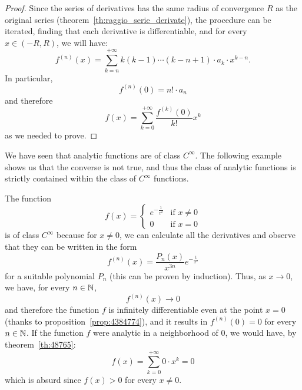 \begin{proof}
Since the series of derivatives has the same radius of convergence $R$ as the
original series (theorem~\ref{th:raggio_serie_derivate}), the procedure can be
iterated, finding that each derivative is differentiable, and for every $x\in
(-R,R)$, we will have:
\[
    f^{(n)}(x) = \sum_{k=n}^{+\infty}k (k-1) \cdots (k-n+1) \cdot a_k \cdot
  x^{k-n}.
\]
In particular,
\[
  f^{(n)}(0) = n! \cdot a_n
\]
and therefore
\[
  f(x) = \sum_{k=0}^{+\infty} \frac{f^{(k)}(0)}{k!} x^k
\]
as we needed to prove.
\end{proof}

We have seen that analytic functions are of class $C^\infty$. The following
example shows us that the converse is not true, and thus the class of analytic
functions is strictly contained within the class of $C^\infty$ functions.

\begin{example}
The function
\[
  f(x) =
  \begin{cases}
    e^{-\frac 1 {x^2}} & \text{if $x\neq 0$}\\
    0 & \text{if $x=0$}
  \end{cases}
\]
is of class $C^\infty$ because for $x\neq 0$, we can calculate all the
derivatives and observe that they can be written in the form
\[
  f^{(n)}(x) = \frac{P_n(x)}{x^{3n}}e^{-\frac 1 {x^2}}
\]
for a suitable polynomial $P_n$ (this can be proven by induction). Thus, as
$x\to 0$, we have, for every $n\in {\mathbb N}$,
\[
  f^{(n)}(x) \to 0
\]
and therefore the function $f$ is infinitely differentiable even at the point
$x=0$ (thanks to proposition~\ref{prop:4384774}), and it results in $f^{(n)}(0)
= 0$ for every $n\in {\mathbb N}$. If the function $f$ were analytic in a neighborhood
of $0$, we would have, by theorem~\ref{th:48765}:
\[
  f(x) = \sum_{k=0}^{+\infty} 0\cdot x^k = 0
\]
which is absurd since $f(x)>0$ for every $x\neq 0$.
\end{example}

